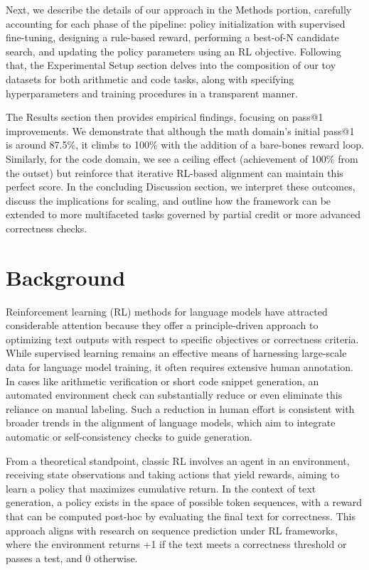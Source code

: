 \documentclass{article}
\begin{document}
Next, we describe the details of our approach in the Methods portion, carefully accounting for each phase of the pipeline: policy initialization with supervised fine-tuning, designing a rule-based reward, performing a best-of-N candidate search, and updating the policy parameters using an RL objective. Following that, the Experimental Setup section delves into the composition of our toy datasets for both arithmetic and code tasks, along with specifying hyperparameters and training procedures in a transparent manner.

The Results section then provides empirical findings, focusing on pass@1 improvements. We demonstrate that although the math domain’s initial pass@1 is around 87.5\%, it climbs to 100\% with the addition of a bare-bones reward loop. Similarly, for the code domain, we see a ceiling effect (achievement of 100\% from the outset) but reinforce that iterative RL-based alignment can maintain this perfect score. In the concluding Discussion section, we interpret these outcomes, discuss the implications for scaling, and outline how the framework can be extended to more multifaceted tasks governed by partial credit or more advanced correctness checks.

\section{Background}
Reinforcement learning (RL) methods for language models have attracted considerable attention because they offer a principle-driven approach to optimizing text outputs with respect to specific objectives or correctness criteria. While supervised learning remains an effective means of harnessing large-scale data for language model training, it often requires extensive human annotation. In cases like arithmetic verification or short code snippet generation, an automated environment check can substantially reduce or even eliminate this reliance on manual labeling. Such a reduction in human effort is consistent with broader trends in the alignment of language models, which aim to integrate automatic or self-consistency checks to guide generation.

From a theoretical standpoint, classic RL involves an agent in an environment, receiving state observations and taking actions that yield rewards, aiming to learn a policy that maximizes cumulative return. In the context of text generation, a policy exists in the space of possible token sequences, with a reward that can be computed post-hoc by evaluating the final text for correctness. This approach aligns with research on sequence prediction under RL frameworks, where the environment returns +1 if the text meets a correctness threshold or passes a test, and 0 otherwise.
\end{document}
